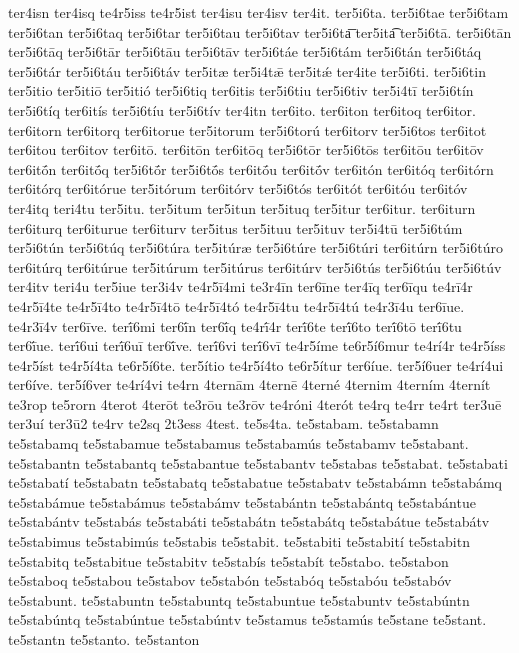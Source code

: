 {ter4isn
ter4isq
te4r5iss
te4r5ist
ter4isu
ter4isv
ter4it.
ter5i6ta.
ter5i6tae
ter5i6tam
ter5i6tan
ter5i6taq
ter5i6tar
ter5i6tau
ter5i6tav
ter5i6ta͞
ter5ita͡
ter5i6tā.
ter5i6tān
ter5i6tāq
ter5i6tār
ter5i6tāu
ter5i6tāv
ter5i6táe
ter5i6tám
ter5i6tán
ter5i6táq
ter5i6tár
ter5i6táu
ter5i6táv
ter5itæ
ter5i4tǣ
ter5itǽ
ter4ite
ter5i6ti.
ter5i6tin
ter5itio
ter5itiō
ter5itió
ter5i6tiq
ter6itis
ter5i6tiu
ter5i6tiv
ter5i4tī
ter5i6tín
ter5i6tíq
ter6itís
ter5i6tíu
ter5i6tív
ter4itn
ter6ito.
ter6iton
ter6itoq
ter6itor.
ter6itorn
ter6itorq
ter6itorue
ter5itorum
ter5i6torú
ter6itorv
ter5i6tos
ter6itot
ter6itou
ter6itov
ter6itō.
ter6itōn
ter6itōq
ter5i6tōr
ter5i6tōs
ter6itōu
ter6itōv
ter6itṓn
ter6itṓq
ter5i6tṓr
ter5i6tṓs
ter6itṓu
ter6itṓv
ter6itón
ter6itóq
ter6itórn
ter6itórq
ter6itórue
ter5itórum
ter6itórv
ter5i6tós
ter6itót
ter6itóu
ter6itóv
ter4itq
teri4tu
ter5itu.
ter5itum
ter5itun
ter5ituq
ter5itur
ter6itur.
ter6iturn
ter6iturq
ter6iturue
ter6iturv
ter5itus
ter5ituu
ter5ituv
ter5i4tū
ter5i6túm
ter5i6tún
ter5i6túq
ter5i6túra
ter5itúræ
ter5i6túre
ter5i6túri
ter6itúrn
ter5i6túro
ter6itúrq
ter6itúrue
ter5itúrum
ter5itúrus
ter6itúrv
ter5i6tús
ter5i6túu
ter5i6túv
ter4itv
teri4u
ter5iue
ter3i4v
te4r5ī4mi
te3r4īn
ter6īne
ter4īq
ter6īqu
te4rī4r
te4r5ī4te
te4r5ī4to
te4r5ī4tō
te4r5ī4tó
te4r5ī4tu
te4r5ī4tú
te4r3ī4u
ter6īue.
te4r3ī4v
ter6īve.
terī́6mi
ter6ī́n
ter6ī́q
te4rī́4r
terī́6te
terī́6to
terī́6tō
terī́6tu
ter6ī́ue.
terī́6ui
terī́6uī
ter6ī́ve.
terī́6vi
terī́6vī
te4r5íme
te6r5í6mur
te4rí4r
te4r5íss
te4r5íst
te4r5í4ta
te6r5í6te.
ter5ítio
te4r5í4to
te6r5ítur
ter6íue.
ter5í6uer
te4rí4ui
ter6íve.
ter5í6ver
te4rí4vi
te4rn
4ternām
4ternē
4terné
4ternim
4terním
4ternít
te3rop
te5rorn
4terot
4terōt
te3rōu
te3rōv
te4róni
4terót
te4rq
te4rr
te4rt
ter3uē
ter3uí
ter3ū2
te4rv
te2sq
2t3ess
4test.
te5s4ta.
te5stabam.
te5stabamn
te5stabamq
te5stabamue
te5stabamus
te5stabamús
te5stabamv
te5stabant.
te5stabantn
te5stabantq
te5stabantue
te5stabantv
te5stabas
te5stabat.
te5stabati
te5stabatí
te5stabatn
te5stabatq
te5stabatue
te5stabatv
te5stabámn
te5stabámq
te5stabámue
te5stabámus
te5stabámv
te5stabántn
te5stabántq
te5stabántue
te5stabántv
te5stabás
te5stabáti
te5stabátn
te5stabátq
te5stabátue
te5stabátv
te5stabimus
te5stabimús
te5stabis
te5stabit.
te5stabiti
te5stabití
te5stabitn
te5stabitq
te5stabitue
te5stabitv
te5stabís
te5stabít
te5stabo.
te5stabon
te5staboq
te5stabou
te5stabov
te5stabón
te5stabóq
te5stabóu
te5stabóv
te5stabunt.
te5stabuntn
te5stabuntq
te5stabuntue
te5stabuntv
te5stabúntn
te5stabúntq
te5stabúntue
te5stabúntv
te5stamus
te5stamús
te5stane
te5stant.
te5stantn
te5stanto.
te5stanton
}
